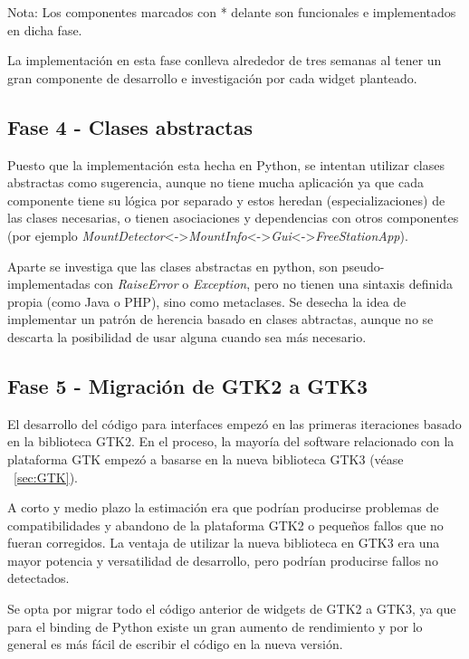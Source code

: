 Nota: Los componentes marcados con * delante son funcionales e implementados en
dicha fase.

La implementación en esta fase conlleva alrededor de tres semanas al tener un gran
componente de desarrollo e investigación por cada widget planteado.

\newpage

\subsection{Fase 4 - Clases abstractas}

Puesto que la implementación esta hecha en Python, se intentan utilizar clases
abstractas como sugerencia, aunque no tiene mucha aplicación ya que cada
componente tiene su lógica por separado y estos heredan (especializaciones) de
las clases necesarias, o tienen asociaciones y dependencias con otros
componentes (por ejemplo
\emph{MountDetector}<->\emph{MountInfo}<->\emph{Gui}<->\emph{FreeStationApp}).

Aparte se investiga que las clases abstractas en python, son
pseudo-implementadas con \emph{RaiseError} o \emph{Exception}, pero no tienen
una sintaxis definida propia (como Java o PHP), sino como metaclases. Se desecha
la idea de implementar un patrón de herencia basado en clases abtractas, 
aunque no se descarta la posibilidad de usar alguna cuando sea más necesario.

\subsection{Fase 5 - Migración de GTK2 a GTK3}

El desarrollo del código para interfaces empezó en las primeras iteraciones
basado en la biblioteca GTK2. En el proceso, la mayoría del software relacionado
con la plataforma GTK empezó a basarse en la nueva biblioteca GTK3 (véase
~\ref{sec:GTK}).

A corto y medio plazo la estimación era que podrían producirse problemas de
compatibilidades y abandono de la plataforma GTK2 o pequeños fallos que no
fueran corregidos. La ventaja de utilizar la nueva biblioteca en GTK3 era una
mayor potencia y versatilidad de desarrollo, pero podrían producirse fallos no detectados.

Se opta por migrar todo el código anterior de widgets de GTK2 a GTK3, ya que
para el binding de Python existe un gran aumento de rendimiento y por lo general
es más fácil de escribir el código en la nueva versión.


